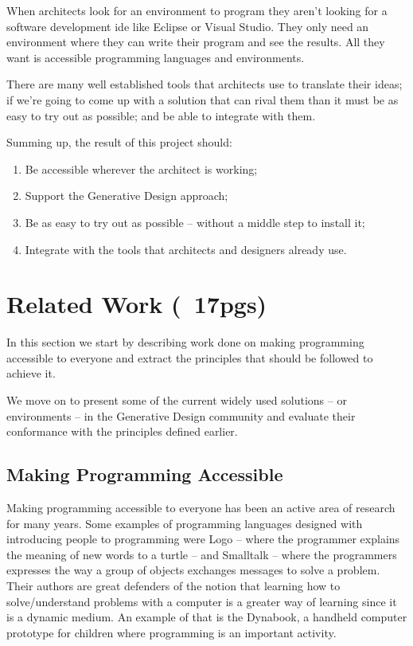 \documentclass{./llncs2e/llncs}
\begin{document}
When architects look for an environment to program they aren't looking for a software development \ac{ide} like Eclipse or Visual Studio. They only need an environment where they can write their program and see the results. All they want is accessible programming languages and environments.

There are many well established tools that architects use to translate their ideas; if we're going to come up with a solution that can rival them than it must be as easy to try out as possible; and be able to integrate with them.

Summing up, the result of this project should:
\begin{enumerate}
	\item Be accessible wherever the architect is working; \label{obj:access}
	\item Support the Generative Design approach; \label{obj:gen-design}
	\item Be as easy to try out as possible -- without a middle step to install it; \label{obj:no-install}
	\item Integrate with the tools that architects and designers already use.\label{obj:inter-op}
\end{enumerate}


\section{Related Work (~17pgs)}
In this section we start by describing work done on making programming accessible to everyone and extract the principles that should be followed to achieve it.

We move on to present some of the current widely used solutions -- or environments -- in the Generative Design community and evaluate their conformance with the principles defined earlier.

\subsection{Making Programming Accessible}
Making programming accessible to everyone has been an active area of research for many years. Some examples of programming languages designed with introducing people to programming were Logo\cite{papert1999logo} -- where the programmer explains the meaning of new words to a turtle -- and Smalltalk\cite{goldberg1983smalltalk} -- where the programmers expresses the way a group of objects exchanges messages to solve a problem. Their authors are great defenders of the notion that learning how to solve/understand problems with a computer is a greater way of learning since it is a dynamic medium. An example of that is the Dynabook\cite{Kay:2011:PCC:800193.1971922}, a handheld computer prototype for children where programming is an important activity.
\end{document}
